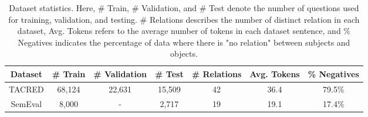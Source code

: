 \begin{table*}[ht]
	\begin{center}
		\small
	\label{tab:dataset_statistics}
		\begin{tabular}{ccccccc} 
        \toprule
		\rule{0pt}{9pt} 
		\textbf{Dataset} & \# Train &  \# Validation & \# Test & \# Relations & Avg. Tokens & \% Negatives \\ 
        \midrule
		TACRED              &   68,124 &    22,631 &  15,509   & 42 & 36.4 & 79.5\% \\
		SemEval             &   8,000  & -         &  2,717    & 19 & 19.1 & 17.4\% \\
        \bottomrule
		\end{tabular}
	\end{center}
	\caption{Dataset statistics. Here,  \# Train, \# Validation, and \# Test denote the number of questions used for training, validation, and testing. \# Relations describes the number of distinct relation in each dataset, Avg. Tokens refers to the average number of tokens in each dataset sentence,
	and \% Negatives indicates the percentage of data where there is "no relation" between subjects and objects. \\}
\end{table*}
